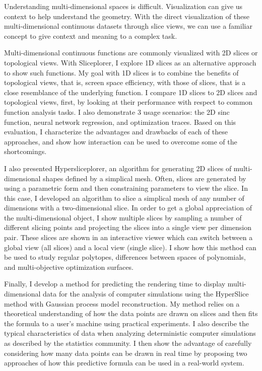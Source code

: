 
Understanding multi-dimensional spaces is difficult. Visualization can give
us context to help understand the geometry. With the direct visualization
of these multi-dimensional continuous datasets through slice views, we can
use a familiar concept to give context and meaning to a complex task.

Multi-dimensional continuous functions are commonly visualized with 2D slices
or topological views. With Sliceplorer, I explore 1D slices as an alternative
approach to show such functions. My goal with 1D slices is to combine the
benefits of topological views, that is, screen space efficiency, with those of
slices, that is a close resemblance of the underlying function.  I compare 1D
slices to 2D slices and topological views, first, by looking at their
performance with respect to common function analysis tasks. I also demonstrate
3 usage scenarios: the 2D sinc function, neural network regression, and
optimization traces. Based on this evaluation, I characterize the advantages
and drawbacks of each of these approaches, and show how interaction can be used
to overcome some of the shortcomings. 


I also presented Hypersliceplorer, an algorithm for generating 2D
slices of multi-dimensional shapes defined by a simplical mesh.  Often, slices
are generated by using a parametric form and then constraining parameters to
view the slice. In this case, I developed an algorithm to slice a simplical
mesh of any number of dimensions with a two-dimensional slice. In order to get
a global appreciation of the multi-dimensional object, I show multiple slices
by sampling a number of different slicing points and projecting the slices into
a single view per dimension pair. These slices are shown in an interactive
viewer which can switch between a global view (all slices) and a local view
(single slice). I show how this method can be used to study regular polytopes,
differences between spaces of polynomials, and multi-objective optimization
surfaces. 


Finally, I develop a method for predicting the rendering time to display
multi-dimensional data for the analysis of computer simulations using the
HyperSlice~\cite{Wijk:1993} method with Gaussian process model reconstruction.
My method relies on a theoretical understanding of how the data points are
drawn on slices and then fits the formula to a user's machine using practical
experiments.  I also describe the typical characteristics of data when
analyzing deterministic computer simulations as described by the statistics
community.  I then show the advantage of carefully considering how many data
points can be drawn in real time by proposing two approaches of how this
predictive formula can be used in a real-world system.

